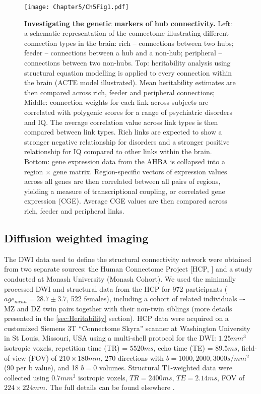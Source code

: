 \begin{figure}[h!]
\begin{center}
\texttt{[image: Chapter5/Ch5Fig1.pdf]}%
\end{center}
\caption{\textbf{Investigating the genetic markers of hub connectivity.}
Left: a schematic representation of the connectome illustrating different connection types in the brain: rich – connections between two hubs; feeder – connections between a hub and a non-hub; peripheral – connections between two non-hubs. Top: heritability analysis using structural equation modelling is applied to every connection within the brain (ACTE model illustrated). Mean heritability estimates are then compared across rich, feeder and peripheral connections; Middle: connection weights for each link across subjects are correlated with polygenic scores for a range of psychiatric disorders and IQ. The average correlation value across link types is then compared between link types. Rich links are expected to show a stronger negative relationship for disorders and a stronger positive relationship for IQ compared to other links within the brain. Bottom: gene expression data from the AHBA is collapsed into a region $\times$ gene matrix. Region-specific vectors of expression values across all genes are then correlated between all pairs of regions, yielding a measure of transcriptional coupling, or correlated gene expression (CGE). Average CGE values are then compared across rich, feeder and peripheral links.}
\label{fig:Ch5Fig1}
\end{figure}

\subsection*{Diffusion weighted imaging}
\label{sec:DWI}

The DWI data used to define the structural connectivity network were obtained from two separate sources: the Human Connectome Project [HCP, \citep{VanEssen2013}] and a study conducted at Monash University (Monash Cohort). We used the minimally processed DWI and structural data from the HCP for 972 participants ($age_{mean} = 28.7 \pm 3.7$, 522 females), including a cohort of related individuals –- MZ and DZ twin pairs together with their non-twin siblings (more details presented in the \ref{sec:Heritability} section). HCP data were acquired on a customized Siemens 3T ``Connectome Skyra'' scanner at Washington University in St Louis, Missouri, USA using a multi‐shell protocol for the DWI: $1.25 mm^{3}$ isotropic voxels, repetition time (TR) = $5520ms$, echo time (TE) = $89.5 ms$,  field-of-view (FOV) of $210 \times 180 mm$, $270$ directions with $b = 1000, 2000, 3000 s/mm^{2}$ (90 per b value), and 18 $b = 0$ volumes. Structural T1-weighted data were collected using $0.7 mm^{3}$ isotropic voxels, $TR = 2400 ms$, $TE = 2.14 ms$, FOV of $224 \times 224 mm$. The full details can be found elsewhere \citep{Glasser2013}.

